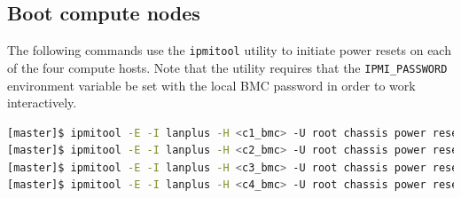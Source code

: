 \documentclass[letterpaper]{article}
\begin{document}


\subsection{Boot compute nodes}

 
The following commands use the \texttt{ipmitool} utility to initiate power
resets on each of the four compute hosts. Note that the utility requires that
the \texttt{IPMI\_PASSWORD} environment variable be set with the local BMC password in
order to work interactively.


\begin{lstlisting}[language=bash,keywords={},upquote=true]
[master]$ ipmitool -E -I lanplus -H <c1_bmc> -U root chassis power reset   # power cycle c1
[master]$ ipmitool -E -I lanplus -H <c2_bmc> -U root chassis power reset   # power cycle c2
[master]$ ipmitool -E -I lanplus -H <c3_bmc> -U root chassis power reset   # power cycle c3
[master]$ ipmitool -E -I lanplus -H <c4_bmc> -U root chassis power reset   # power cycle c4
\end{lstlisting} 


\end{document}
